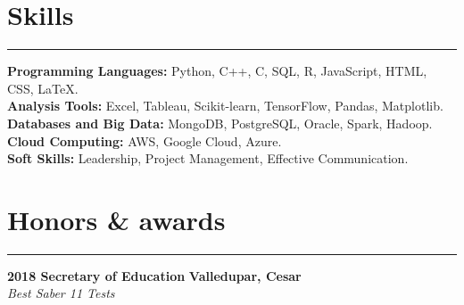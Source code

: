 \documentclass[9pt,a4paper]{article}
\newcommand{\cvevent}[4]{%
  {\noindent \textbf{#1 #2} \hfill \textbf{#3}\\%
   \textit{#4}\\[0pt]}%
}
\begin{document}
\section*{Skills}
\vspace{-\baselineskip}
\noindent\rule{\linewidth}{0.5pt}

\textbf{Programming Languages:} Python, C++, C, SQL, R, JavaScript, HTML, CSS, LaTeX.\\
\textbf{Analysis Tools:} Excel, Tableau, Scikit-learn, TensorFlow, Pandas, Matplotlib.\\
\textbf{Databases and Big Data:} MongoDB, PostgreSQL, Oracle, Spark, Hadoop.\\
\textbf{Cloud Computing:} AWS, Google Cloud, Azure.\\
\textbf{Soft Skills:} Leadership, Project Management, Effective Communication.

\section*{Honors \& awards}
\vspace{-\baselineskip}
\noindent\rule{\linewidth}{0.5pt}

\cvevent{2018}{Secretary of Education}{Valledupar, Cesar}{Best Saber 11 Tests}
\vspace{-\baselineskip}
\end{document}
